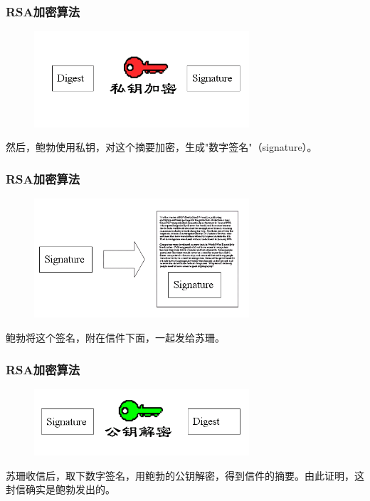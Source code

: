 \documentclass[slidestop,compress,mathserif]{beamer}
\begin{document}
\begin{frame}
  \transboxout
  \frametitle{RSA加密算法}
  \begin{center}
    \begin{figure}
      \includegraphics[width=8cm]{bg6}
    \end{figure}
    然后，鲍勃使用私钥，对这个摘要加密，生成"数字签名"（signature）。
  \end{center}
\end{frame}

\begin{frame}
  \transboxout
  \frametitle{RSA加密算法}
  \begin{center}
    \begin{figure}
      \includegraphics[width=8cm]{bg7}
    \end{figure}
    鲍勃将这个签名，附在信件下面，一起发给苏珊。
  \end{center}
\end{frame}

\begin{frame}
  \transboxout
  \frametitle{RSA加密算法}
  \begin{center}
    \begin{figure}
      \includegraphics[width=8cm]{bg8}
    \end{figure}
    苏珊收信后，取下数字签名，用鲍勃的公钥解密，得到信件的摘要。由此证明，这封信确实是鲍勃发出的。
  \end{center}
\end{frame}
\end{document}
